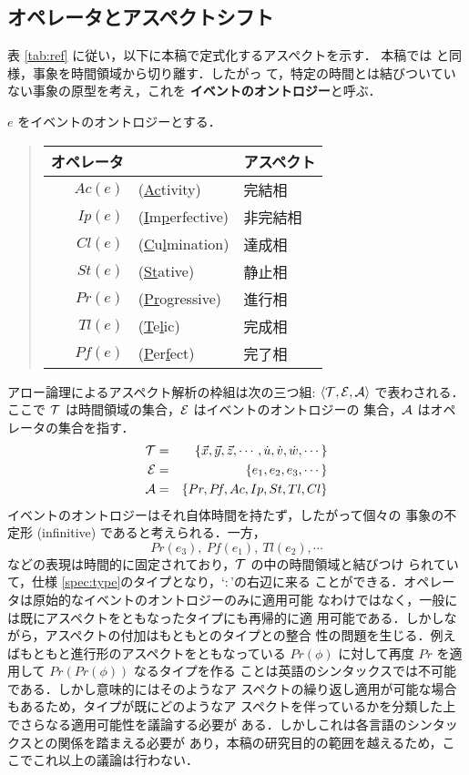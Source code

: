 \subsection{オペレータとアスペクトシフト}
表 \ref{tab:ref} に従い，以下に本稿で定式化するアスペクトを示す．
本稿では \cite{Blackburn96} と同様，事象を時間領域から切り離す．したがっ
て，特定の時間とは結びついていない事象の原型を考え，これを
{\bf イベントのオントロジー}と呼ぶ．
\begin{my-def}[オペレータ]\label{def:ope}
$e$ をイベントのオントロジーとする．
\begin{quote}
\begin{tabular}[b]{rll}
オペレータ&&アスペクト\\ \hline 
$Ac(e)$& (\underline{Ac}tivity)&完結相 \\ 
$Ip(e)$& (\underline{I}m\underline{p}erfective)&非完結相 \\ 
$Cl(e)$& (\underline{C}u\underline{l}mination)&達成相 \\
$St(e)$& (\underline{St}ative)&静止相 \\ 
$Pr(e)$& (\underline{Pr}ogressive)&進行相 \\
$Tl(e)$& (\underline{T}e\underline{l}ic)&完成相 \\
$P\!f(e)$& (\underline{P}er\underline{f}ect)&完了相 \\ \hline
\end{tabular}
\end{quote}
\end{my-def}

アロー論理によるアスペクト解析の枠組は次の三つ組: $\langle {\cal T}, {\cal E},
{\cal A}\rangle$ で表わされる． 
ここで $\cal T$ は時間領域の集合，$\cal E$ はイベントのオントロジーの
集合，$\cal A$ はオペレータの集合を指す．
\begin{eqnarray*}
{\cal T} &=& \{{\vec x},{\vec y},{\vec z},\cdots,{\dot u},{\dot
v},{\dot w},\cdots\}\\
{\cal E} &=& \{e_1, e_2, e_3,\cdots\}\\
{\cal A} &=& \{Pr, P\!f, Ac, Ip, St, Tl, Cl\}
\end{eqnarray*}
イベントのオントロジーはそれ自体時間を持たず，したがって個々の
事象の不定形 (infinitive) であると考えられる．一方，
\[Pr(e_3),~P\!f(e_1),~Tl(e_2),\cdots\]
などの表現は時間的に固定されており，$\cal T$ の中の時間領域と結びつけ
られていて，仕様 \ref{spec:type}のタイプとなり，`$\colon$'の右辺に来る
ことができる．オペレータは原始的なイベントのオントロジーのみに適用可能
なわけではなく，一般には既にアスペクトをともなったタイプにも再帰的に適
用可能である．しかしながら，アスペクトの付加はもともとのタイプとの整合
性の問題を生じる．例えばもともと進行形のアスペクトをともなっている 
$Pr(\phi)$ に対して再度 $Pr$ を適用して $Pr(Pr(\phi))$ なるタイプを作る
ことは英語のシンタックスでは不可能である．しかし意味的にはそのようなア
スペクトの繰り返し適用が可能な場合もあるため，タイプが既にどのようなア
スペクトを伴っているかを分類した上でさらなる適用可能性を議論する必要が
ある．しかしこれは各言語のシンタックスとの関係を踏まえる必要が
あり，本稿の研究目的の範囲を越えるため，ここでこれ以上の議論は行わない．

